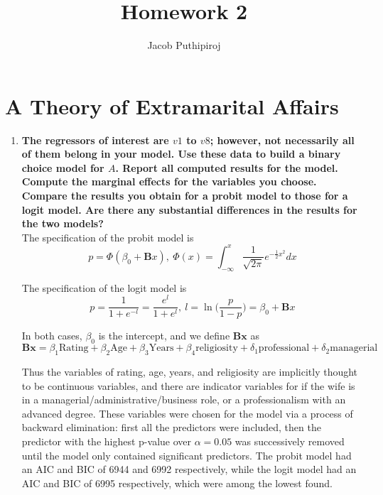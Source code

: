 \documentclass{article}
\begin{document}
\title{\vspace{-2.0cm}Homework 2}
\author{Jacob Puthipiroj}
\maketitle


\section{A Theory of Extramarital Affairs}

\begin{enumerate}[label=(\alph*)]
\item \textbf{The regressors of interest are $v1$ to $v8$; however, not necessarily all of them belong in your model. Use these data to build a binary choice model for $A$. Report all computed results for the model. Compute the marginal effects for the variables you choose. Compare the results you obtain for a probit model to those for a logit model. Are there any substantial differences in the results for the two models?}\\

The specification of the probit model is 
$$ p = \Phi(\beta_0 + \textbf{B}x), \ \Phi(x) = \int_{-\infty}^x \frac{1}{\sqrt{2 \pi } } e^{-\frac{1}{2}x^2} dx$$


The specification of the logit model is 
$$ p = \frac{1}{1+e^{-l}} = \frac{e^l}{1 + e^l}, \ l = \ln \Big( \frac{p}{1-p} \Big) = \beta_0 + \textbf{B}x$$

In both cases, $\beta_0$ is the intercept, and we define $\textbf{Bx}$ as
$$ \textbf{Bx} = \beta_{1}\text{Rating} + \beta_2 \text{Age} + \beta_3 \text{Years} + \beta_4 \text{religiosity} + \delta_1 \text{professional} + \delta_2 \text{managerial}$$

Thus the variables of rating, age, years, and religiosity are implicitly thought to be continuous variables, and there are indicator variables for if the wife is in a managerial/administrative/business role, or a professionalism with an advanced degree. These variables were chosen for the model via a process of backward elimination: first all the predictors were included, then the predictor with the highest p-value over $\alpha = 0.05$ was successively removed until the model only contained significant predictors. The probit model had an AIC and BIC of 6944 and 6992 respectively, while the logit model had an AIC and BIC of 6995 respectively, which were among the lowest found.  \\


\end{enumerate}
\end{document}
